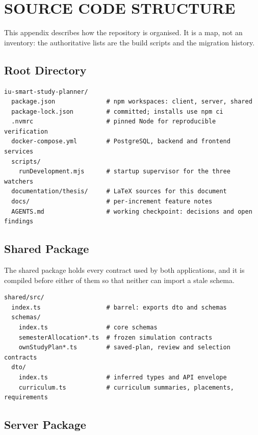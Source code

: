 \chapter{SOURCE CODE STRUCTURE}

This appendix describes how the repository is organised. It is a map, not an inventory: the
authoritative lists are the build scripts and the migration history.

\section{Root Directory}

\begin{lstlisting}
iu-smart-study-planner/
  package.json              # npm workspaces: client, server, shared
  package-lock.json         # committed; installs use npm ci
  .nvmrc                    # pinned Node for reproducible verification
  docker-compose.yml        # PostgreSQL, backend and frontend services
  scripts/
    runDevelopment.mjs      # startup supervisor for the three watchers
  documentation/thesis/     # LaTeX sources for this document
  docs/                     # per-increment feature notes
  AGENTS.md                 # working checkpoint: decisions and open findings
\end{lstlisting}

\section{Shared Package}

The shared package holds every contract used by both applications, and it is compiled before either
of them so that neither can import a stale schema.

\begin{lstlisting}
shared/src/
  index.ts                  # barrel: exports dto and schemas
  schemas/
    index.ts                # core schemas
    semesterAllocation*.ts  # frozen simulation contracts
    ownStudyPlan*.ts        # saved-plan, review and selection contracts
  dto/
    index.ts                # inferred types and API envelope
    curriculum.ts           # curriculum summaries, placements, requirements
\end{lstlisting}

\section{Server Package}

